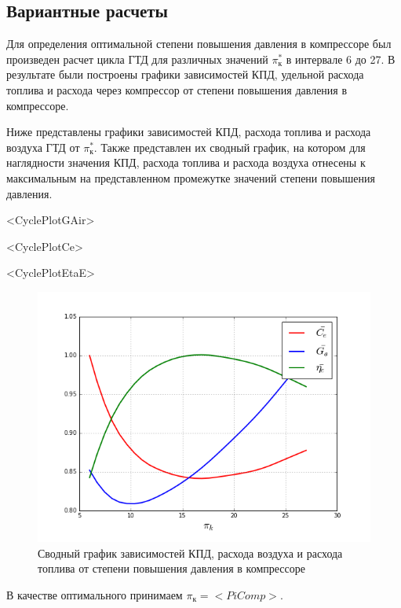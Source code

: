 \documentclass[a4paper,10pt]{article}
\begin{document}
\subsection{Вариантные расчеты}
Для определения оптимальной степени повышения давления в компрессоре был произведен расчет цикла ГТД для различных значений  $\pi_к^*$ в интервале 6 до 27. В результате были построены графики зависимостей КПД, удельной расхода топлива и расхода через компрессор от степени повышения давления в компрессоре.

Ниже представлены графики зависимостей КПД, расхода топлива и расхода воздуха ГТД от $\pi_к^*$. Также представлен их сводный график, на котором для наглядности значения КПД, расхода топлива и расхода воздуха отнесены к максимальным на представленном промежутке значений степени повышения давления.

\begin{center}


	<CyclePlotGAir>	
	
	<CyclePlotCe>
	 
	<CyclePlotEtaE> 
\end{center}

\begin{figure}[hbtp]
\centering
\includegraphics[scale=0.5]{../../plots/cycle_relative_quantities.png}
\caption{Сводный график зависимостей КПД, расхода воздуха и расхода топлива от степени повышения давления в компрессоре}
\end{figure}



В качестве оптимального принимаем $\pi_к = <PiComp>$.
\end{document}
